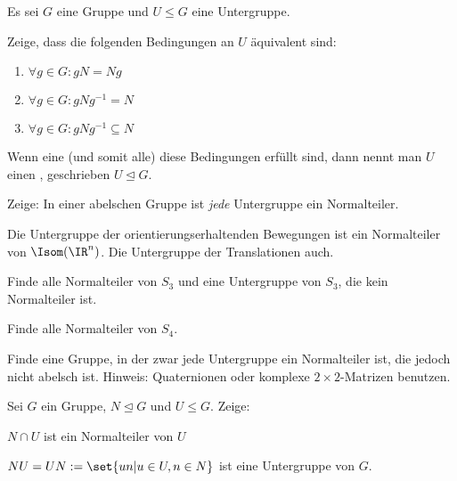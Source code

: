 \begin{sheet}
\begin{problem}
Es sei $G$ eine Gruppe und $U\leq G$ eine Untergruppe.
\begin{subproblem}[difficulty={leicht}]
Zeige, dass die folgenden Bedingungen an $U$ äquivalent sind:
\begin{enumerate}[label=(\roman*)]
\item $\forall g\in G: gN=Ng$
\item $\forall g\in G: gNg^{-1} = N$
\item $\forall g\in G: gNg^{-1} \subseteq N$
\end{enumerate}
\end{subproblem}
Wenn eine (und somit alle) diese Bedingungen erfüllt sind, dann nennt man $U$ einen , geschrieben $U\unlhd G$.

\begin{subproblem}[difficulty={sehr leicht}]
Zeige: In einer abelschen Gruppe ist \emph{jede} Untergruppe ein Normalteiler.
\end{subproblem}
\begin{subproblem}
Die Untergruppe der orientierungserhaltenden Bewegungen ist ein Normalteiler von $\Isom(\IR^n)$. Die Untergruppe der Translationen auch.
\end{subproblem}
\begin{subproblem}[difficulty={leicht}]
Finde alle Normalteiler von $S_3$ und eine Untergruppe von $S_3$, die kein Normalteiler ist.
\end{subproblem}
\begin{subproblem}[difficulty={mittel}]
Finde alle Normalteiler von $S_4$.
\end{subproblem}
\begin{subproblem}[difficulty={schwer}]
Finde eine Gruppe, in der zwar jede Untergruppe ein Normalteiler ist, die jedoch nicht abelsch ist. Hinweis: Quaternionen oder komplexe $2\times 2$-Matrizen benutzen.
\end{subproblem}
\end{problem}

\begin{problem}[title={Normalteiler und Untergruppen}]
Sei $G$ ein Gruppe, $N\unlhd G$ und $U\leq G$. Zeige:

\begin{subproblem}[difficulty={leicht}]
$N\cap U$ ist ein Normalteiler von $U$
\end{subproblem}
\begin{subproblem}[difficulty={leicht bis mittel}]
$NU = UN := \set{un | u\in U, n\in N}$ ist eine Untergruppe von $G$.
\end{subproblem}
\end{problem}


\end{sheet}
